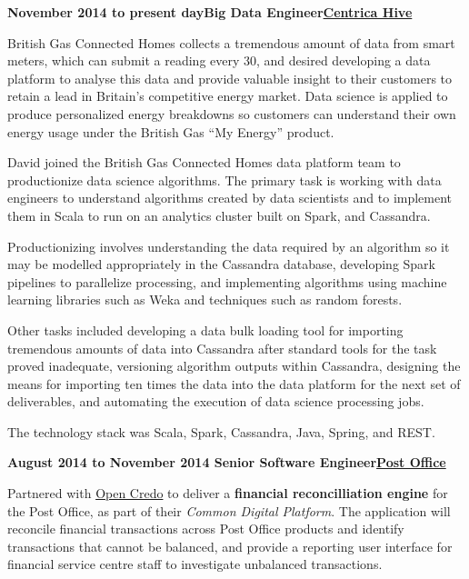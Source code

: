 \documentclass[a4paper,12pt]{article}
\newcommand{\head}[1]{\begin{center}{\large{\textbf{\sc{#1}}}}\nopagebreak\end{center}}
\newcommand{\clientwork}[3]{\textbf{#1\hfill#3\hfill#2}\nopagebreak}
\begin{document}
\head{Career History}

\clientwork{November 2014 to present day}{\href{https://www.hivehome.com}{Centrica Hive}}{Big Data Engineer}

British Gas Connected Homes collects a tremendous amount of data from smart meters, which can submit a reading every 30, and desired developing a data platform to analyse this data and provide valuable insight to their customers to retain a lead in Britain’s competitive energy market. Data science is applied to produce personalized energy breakdowns so customers can understand their own energy usage under the British Gas “My Energy” product.

David joined the British Gas Connected Homes data platform team to productionize data science algorithms. The primary task is working with data engineers to understand algorithms created by data scientists and to implement them in Scala to run on an analytics cluster built on Spark, and Cassandra.

Productionizing involves understanding the data required by an algorithm so it may be modelled appropriately in the Cassandra database, developing Spark pipelines to parallelize processing, and implementing algorithms using machine learning libraries such as Weka and techniques such as random forests.

Other tasks included developing a data bulk loading tool for importing tremendous amounts of data into Cassandra after standard tools for the task proved inadequate, versioning algorithm outputs within Cassandra, designing the means for importing ten times the data into the data platform for the next set of deliverables, and automating the execution of data science processing jobs.

The technology stack was Scala, Spark, Cassandra, Java, Spring, and REST.

\clientwork{August 2014 to November 2014 }{\href{http://www.postoffice.co.uk/}{Post Office}}{Senior Software Engineer}

Partnered with \href{http://www.opencredo.com/}{Open Credo} to deliver a \textbf{financial reconcilliation engine} for the Post Office, as part of their \emph{Common Digital Platform}. The application will reconcile financial transactions across Post Office products and identify transactions that cannot be balanced, and provide a reporting user interface for financial service centre staff to investigate unbalanced transactions.\\
\end{document}
